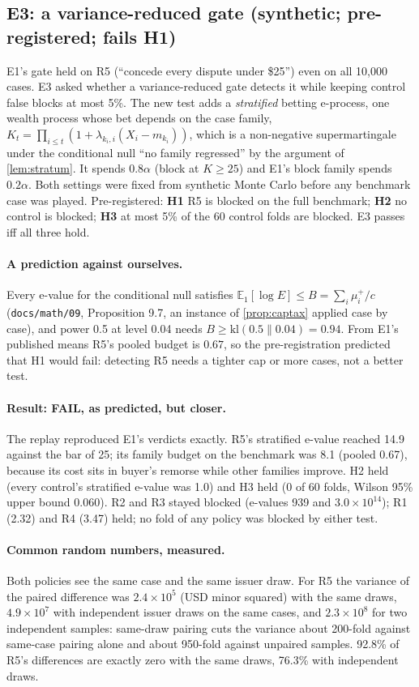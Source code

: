 \documentclass[11pt]{article}
\theoremstyle{definition}
\theoremstyle{remark}
\newcommand{\E}{\mathbb{E}}
\newcommand{\kl}{\mathrm{kl}}
\newcommand{\1}{\mathbf{1}}
\begin{document}
\subsection{E3: a variance-reduced gate (synthetic; pre-registered; fails H1)}\label{sec:e3}

E1's gate held on R5 (``concede every dispute under \$25'') even on all 10{,}000 cases. E3 asked whether a variance-reduced gate detects it while keeping control false blocks at most 5\%. The new test adds a \emph{stratified} betting e-process, one wealth process whose bet depends on the case family, $K_t=\prod_{i\le t}(1+\lambda_{k_i,i}(X_i-m_{k_i}))$, which is a non-negative supermartingale under the conditional null ``no family regressed'' by the argument of \cref{lem:stratum}. It spends $0.8\alpha$ (block at $K\ge25$) and E1's block family spends $0.2\alpha$. Both settings were fixed from synthetic Monte Carlo before any benchmark case was played. Pre-registered: \textbf{H1} R5 is blocked on the full benchmark; \textbf{H2} no control is blocked; \textbf{H3} at most 5\% of the 60 control folds are blocked. E3 passes iff all three hold.

\paragraph{A prediction against ourselves.} Every e-value for the conditional null satisfies $\E_1[\log E]\le B=\sum_i\mu_i^+/c$ (\texttt{docs/math/09}, Proposition 9.7, an instance of \cref{prop:captax} applied case by case), and power 0.5 at level 0.04 needs $B\ge\kl(0.5\|0.04)=0.94$. From E1's published means R5's pooled budget is $0.67$, so the pre-registration predicted that H1 would fail: detecting R5 needs a tighter cap or more cases, not a better test.

\paragraph{Result: FAIL, as predicted, but closer.} The replay reproduced E1's verdicts exactly. R5's stratified e-value reached 14.9 against the bar of 25; its family budget on the benchmark was 8.1 (pooled 0.67), because its cost sits in buyer's remorse while other families improve. H2 held (every control's stratified e-value was 1.0) and H3 held (0 of 60 folds, Wilson 95\% upper bound 0.060). R2 and R3 stayed blocked (e-values 939 and $3.0\times10^{14}$); R1 (2.32) and R4 (3.47) held; no fold of any policy was blocked by either test.

\paragraph{Common random numbers, measured.} Both policies see the same case and the same issuer draw. For R5 the variance of the paired difference was $2.4\times10^5$ (USD minor squared) with the same draws, $4.9\times10^7$ with independent issuer draws on the same cases, and $2.3\times10^8$ for two independent samples: same-draw pairing cuts the variance about 200-fold against same-case pairing alone and about 950-fold against unpaired samples. 92.8\% of R5's differences are exactly zero with the same draws, 76.3\% with independent draws.
\end{document}
